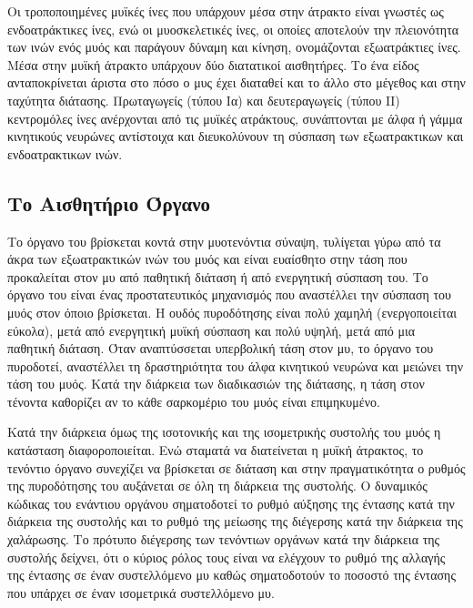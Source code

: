 Οι τροποποιημένες μυϊκές ίνες που υπάρχουν μέσα στην άτρακτο είναι γνωστές ως ενδοατράκτικες ίνες, ενώ οι μυοσκελετικές ίνες, οι οποίες αποτελούν την πλειονότητα των ινών ενός μυός και παράγουν δύναμη και κίνηση, ονομάζονται εξωατράκτιες ίνες. Μέσα στην μυϊκή άτρακτο υπάρχουν δύο διατατικοί αισθητήρες. Το ένα είδος ανταποκρίνεται άριστα στο πόσο ο μυς έχει διαταθεί και το άλλο στο μέγεθος και στην ταχύτητα διάτασης. Πρωταγωγείς (τύπου Ια) και δευτεραγωγείς (τύπου ΙΙ) κεντρομόλες ίνες ανέρχονται από τις μυϊκές ατράκτους, συνάπτονται με άλφα ή γάμμα κινητικούς νευρώνες αντίστοιχα και διευκολύνουν τη σύσπαση των εξωατρακτικων και ενδοατρακτικων ινών.

\subsection{\texorpdfstring{Το Αισθητήριο Όργανο }{}}

Το όργανο του  βρίσκεται κοντά στην μυοτενόντια σύναψη, τυλίγεται γύρω από τα άκρα των εξωατρακτικών ινών του μυός και είναι ευαίσθητο στην τάση που προκαλείται στον μυ από παθητική διάταση ή από ενεργητική σύσπαση του. Το όργανο του  είναι ένας προστατευτικός μηχανισμός που αναστέλλει την σύσπαση του μυός στον όποιο βρίσκεται. Η ουδός πυροδότησης είναι πολύ χαμηλή (ενεργοποιείται εύκολα), μετά από ενεργητική μυϊκή σύσπαση και πολύ υψηλή, μετά από μια παθητική διάταση. Όταν αναπτύσσεται υπερβολική τάση στον μυ, το όργανο του  πυροδοτεί, αναστέλλει τη δραστηριότητα του άλφα κινητικού νευρώνα και μειώνει την τάση του μυός. Κατά την διάρκεια των διαδικασιών της διάτασης, η τάση στον τένοντα καθορίζει αν το κάθε σαρκομέριο του μυός είναι επιμηκυμένο.

Κατά την διάρκεια όμως της ισοτονικής και της ισομετρικής συστολής του μυός η κατάσταση διαφοροποιείται. Ενώ σταματά να διατείνεται η μυϊκή άτρακτος, το τενόντιο όργανο συνεχίζει να βρίσκεται σε διάταση και στην πραγματικότητα ο ρυθμός της πυροδότησης του αυξάνεται σε όλη τη διάρκεια της συστολής. Ο δυναμικός κώδικας του ενάντιου οργάνου σηματοδοτεί το ρυθμό αύξησης της έντασης κατά την διάρκεια της συστολής και το ρυθμό της μείωσης της διέγερσης κατά την διάρκεια της χαλάρωσης. Το πρότυπο διέγερσης των τενόντιων οργάνων κατά την διάρκεια της συστολής δείχνει, ότι ο κύριος ρόλος τους είναι να ελέγχουν το ρυθμό της αλλαγής της έντασης σε έναν συστελλόμενο μυ καθώς σηματοδοτούν το ποσοστό της έντασης που υπάρχει σε έναν ισομετρικά συστελλόμενο μυ.

